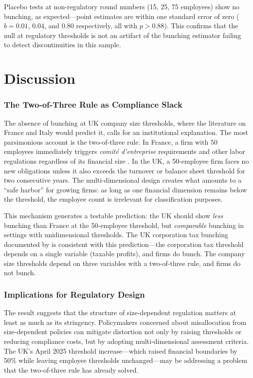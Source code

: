 \documentclass[12pt]{article}
\begin{document}
Placebo tests at non-regulatory round numbers (15, 25, 75 employees) show no bunching, as expected---point estimates are within one standard error of zero ($\hat{b} = 0.01$, 0.04, and 0.80 respectively, all with $p > 0.88$). This confirms that the null at regulatory thresholds is not an artifact of the bunching estimator failing to detect discontinuities in this sample.




\section{Discussion}

\subsubsection*{The Two-of-Three Rule as Compliance Slack} The absence of bunching at UK company size thresholds, where the literature on France and Italy would predict it, calls for an institutional explanation. The most parsimonious account is the two-of-three rule. In France, a firm with 50 employees immediately triggers \textit{comit\'{e} d'entreprise} requirements and other labor regulations regardless of its financial size \citep{garicano2016}. In the UK, a 50-employee firm faces no new obligations unless it also exceeds the turnover or balance sheet threshold for two consecutive years. The multi-dimensional design creates what amounts to a ``safe harbor'' for growing firms: as long as one financial dimension remains below the threshold, the employee count is irrelevant for classification purposes.

This mechanism generates a testable prediction: the UK should show \textit{less} bunching than France at the 50-employee threshold, but \textit{comparable} bunching in settings with unidimensional thresholds. The UK corporation tax bunching documented by \citet{devereux2014} is consistent with this prediction---the corporation tax threshold depends on a single variable (taxable profits), and firms do bunch. The company size thresholds depend on three variables with a two-of-three rule, and firms do not bunch.

\subsubsection*{Implications for Regulatory Design} The result suggests that the structure of size-dependent regulation matters at least as much as its stringency. Policymakers concerned about misallocation from size-dependent policies \citep{hsieh2009, guner2008} can mitigate distortion not only by raising thresholds or reducing compliance costs, but by adopting multi-dimensional assessment criteria. The UK's April 2025 threshold increase---which raised financial boundaries by 50\% while leaving employee thresholds unchanged---may be addressing a problem that the two-of-three rule has already solved.
\end{document}
